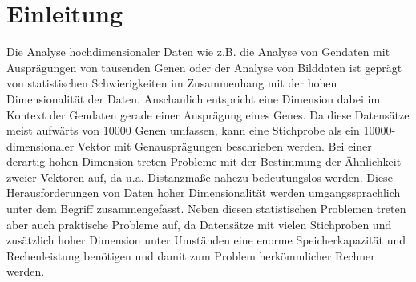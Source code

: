 \chapter{Einleitung}
\label{ch:Enleitung}

Die Analyse hochdimensionaler Daten wie z.B. die Analyse von Gendaten mit Ausprägungen von
tausenden Genen \parencite[siehe z.B.][]{Parmigiani.2003} oder der Analyse von Bilddaten ist geprägt von statistischen
Schwierigkeiten im Zusammenhang mit der hohen Dimensionalität der Daten. Anschaulich entspricht
eine Dimension dabei im Kontext der Gendaten gerade einer Ausprägung eines Genes. Da diese
Datensätze meist aufwärts von \num{10000} Genen umfassen, kann eine Stichprobe als ein
\num{10000}-dimensionaler Vektor mit Genausprägungen beschrieben werden. Bei einer derartig hohen
Dimension treten Probleme mit der Bestimmung der Ähnlichkeit zweier Vektoren auf, da u.a.
Distanzmaße nahezu bedeutungslos werden. Diese Herausforderungen von Daten hoher Dimensionalität
werden umgangssprachlich unter dem Begriff  \parencite{Bellman.1961} zusammengefasst. Neben diesen statistischen Problemen treten aber auch
praktische Probleme auf, da Datensätze mit vielen Stichproben und zusätzlich hoher Dimension unter
Umständen eine enorme Speicherkapazität und Rechenleistung benötigen und damit zum Problem
herkömmlicher Rechner werden.

